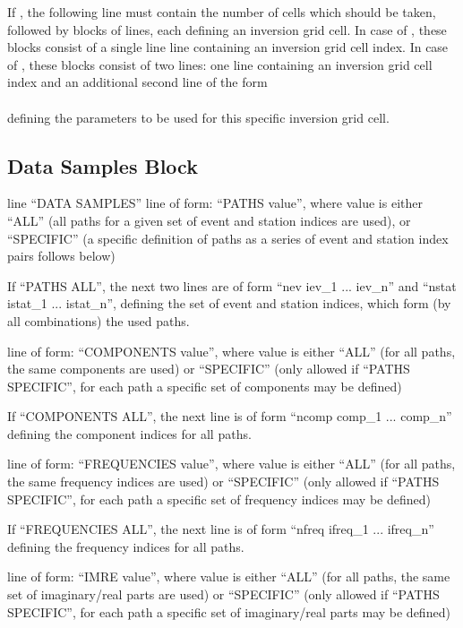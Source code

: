 If , the following line must contain the number of cells  
which should be taken, followed by  blocks of lines, each defining an inversion grid cell. In case
of , these blocks consist of a single line line containing an inversion grid cell index.
In case of , these blocks consist of two lines: one line containing an inversion grid cell
index and an additional second line of the form\\
 \\
defining the parameters to be used for this specific inversion grid cell.

\subsection{Data Samples Block}
line ``DATA SAMPLES''
%
line of form: ``PATHS value'', where value is either ``ALL'' (all paths for a given set of event and station indices
are used), or ``SPECIFIC'' (a specific definition of paths as a series of event and station index pairs follows below)

If ``PATHS ALL'', the next two lines are of form ``nev iev\_1 ... iev\_n'' and ``nstat istat\_1 ... istat\_n'', defining the set
of event and station indices, which form (by all combinations) the used paths. 

line of form: ``COMPONENTS value'', where value is either ``ALL'' (for all paths, the same components are used) or ``SPECIFIC''
(only allowed if ``PATHS SPECIFIC'', for each path a specific set of components may be defined)

If ``COMPONENTS ALL'', the next line is of form ``ncomp comp\_1 ... comp\_n'' defining the component indices for all paths.

line of form: ``FREQUENCIES value'', where value is either ``ALL'' (for all paths, the same frequency indices are used) or ``SPECIFIC''
(only allowed if ``PATHS SPECIFIC'', for each path a specific set of frequency indices may be defined)

If ``FREQUENCIES ALL'', the next line is of form ``nfreq ifreq\_1 ... ifreq\_n'' defining the frequency indices for all paths.

line of form: ``IMRE value'', where value is either ``ALL'' (for all paths, the same set of imaginary/real parts are used) or ``SPECIFIC''
(only allowed if ``PATHS SPECIFIC'', for each path a specific set of imaginary/real parts may be defined)

